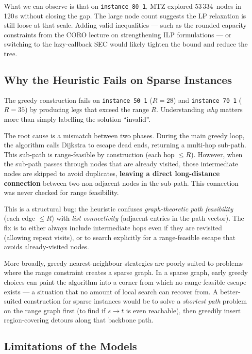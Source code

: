 \documentclass[12pt, a4paper]{article}
\begin{document}
What we can observe is that on \texttt{instance\_80\_1}, MTZ explored 53\,334~nodes
in 120\,s without closing the gap. The large node count suggests the LP relaxation
is still loose at that scale. Adding valid inequalities --- such as the rounded
capacity constraints from the CORO lecture on strengthening ILP formulations ---
or switching to the lazy-callback SEC would likely tighten the bound and reduce the
tree.

\subsection{Why the Heuristic Fails on Sparse Instances}

The greedy construction fails on \texttt{instance\_50\_1} ($R=28$) and
\texttt{instance\_70\_1} ($R=35$) by producing legs that exceed the range $R$.
Understanding \emph{why} matters more than simply labelling the solution ``invalid''.

The root cause is a mismatch between two phases. During the main greedy loop, the
algorithm calls Dijkstra to escape dead ends, returning a multi-hop sub-path. This
sub-path is range-feasible by construction (each hop $\leq R$). However, when the
sub-path passes through nodes that are already visited, those intermediate nodes are
skipped to avoid duplicates, \textbf{leaving a direct long-distance connection}
between two non-adjacent nodes in the sub-path. This connection was never checked
for range feasibility.

This is a structural bug: the heuristic confuses \emph{graph-theoretic path
feasibility} (each edge $\leq R$) with \emph{list connectivity} (adjacent entries
in the path vector). The fix is to either always include intermediate hops even if
they are revisited (allowing repeat visits), or to search explicitly for a
range-feasible escape that avoids already-visited nodes.

More broadly, greedy nearest-neighbour strategies are poorly suited to problems
where the range constraint creates a sparse graph. In a sparse graph, early greedy
choices can paint the algorithm into a corner from which no range-feasible escape
exists --- a situation that no amount of local search can recover from. A
better-suited construction for sparse instances would be to solve a \emph{shortest
path} problem on the range graph first (to find if $s \to t$ is even reachable),
then greedily insert region-covering detours along that backbone path.

\subsection{Limitations of the Models}
\end{document}
